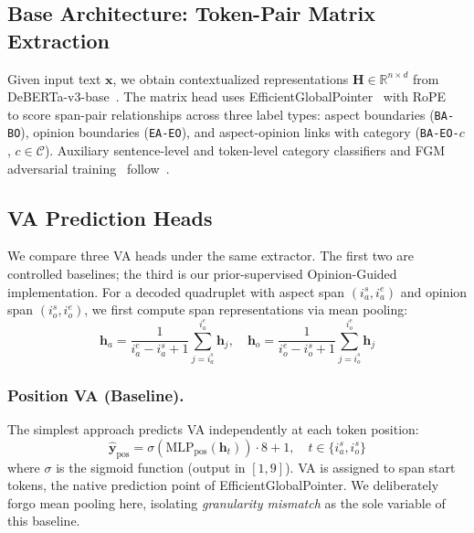 \documentclass[runningheads]{llncs}
\begin{document}
\subsection{Base Architecture: Token-Pair Matrix Extraction}
\label{sec:base}

Given input text $\mathbf{x}$, we obtain contextualized representations $\mathbf{H} \in \mathbb{R}^{n \times d}$ from DeBERTa-v3-base~\cite{he2021deberta,he2021debertav3}. The matrix head uses EfficientGlobalPointer~\cite{su2022globalpointer} with RoPE~\cite{su2024rope} to score span-pair relationships across three label types: aspect boundaries (\texttt{BA-BO}), opinion boundaries (\texttt{EA-EO}), and aspect-opinion links with category (\texttt{BA-EO-}$c$, $c \in \mathcal{C}$). Auxiliary sentence-level and token-level category classifiers and FGM adversarial training~\cite{miyato2017fgm} follow~\cite{gao2023oneasqp}.

\subsection{VA Prediction Heads}
\label{sec:va}

We compare three VA heads under the same extractor. The first two are controlled baselines; the third is our prior-supervised Opinion-Guided implementation. For a decoded quadruplet with aspect span $(i_a^s, i_a^e)$ and opinion span $(i_o^s, i_o^e)$, we first compute span representations via mean pooling:
\begin{equation}
    \mathbf{h}_a = \frac{1}{i_a^e - i_a^s + 1}\sum_{j=i_a^s}^{i_a^e} \mathbf{h}_j, \quad
    \mathbf{h}_o = \frac{1}{i_o^e - i_o^s + 1}\sum_{j=i_o^s}^{i_o^e} \mathbf{h}_j
    \label{eq:pool}
\end{equation}

\subsubsection{Position VA (Baseline).}
The simplest approach predicts VA independently at each token position:
\begin{equation}
    \hat{\mathbf{y}}_{\text{pos}} = \sigma(\text{MLP}_{\text{pos}}(\mathbf{h}_t)) \cdot 8 + 1, \quad t \in \{i_a^s, i_o^s\}
\end{equation}
where $\sigma$ is the sigmoid function (output in $[1, 9]$). VA is assigned to span start tokens, the native prediction point of EfficientGlobalPointer. We deliberately forgo mean pooling here, isolating \emph{granularity mismatch} as the sole variable of this baseline.
\end{document}
